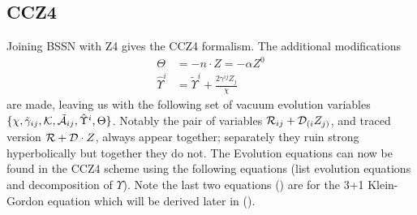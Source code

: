 \subsection{CCZ4}
Joining BSSN with Z4 gives the CCZ4 formalism. The additional modifications
\begin{align} \Theta &= -n\cdot Z  = -\alpha Z^0\\
\hat{\Upsilon}^i &= \tilde{\Upsilon}^i + \frac{2\gamma^{ij}Z_j}{\chi}\end{align}
are made, leaving us with the following set of vacuum evolution variables $\{\chi, \tilde{\gamma}_{ij},\mathcal{K},\tilde{\mathcal{A}}_{ij},\hat{\Upsilon}^i,\Theta \}$. Notably the pair of variables $\mathcal{R}_{ij} + \mathcal{D}_{(i}Z_{j)}$, and traced version $\mathcal{R} + \mathcal{D}\cdot Z$, always appear together; separately they ruin strong hyperbolically but together they do not. The Evolution equations can now be found in the CCZ4 scheme using the following equations (list evolution equations and decomposition of $\Upsilon$). Note the last two equations () are for the 3+1 Klein-Gordon equation which will be derived later in (). 
